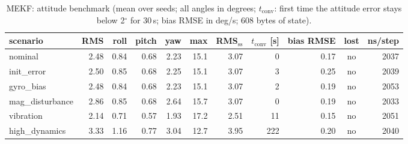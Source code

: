 \begin{table}[H]\centering\footnotesize\setlength{\tabcolsep}{3.5pt}\caption{MEKF: attitude benchmark (mean over seeds; all angles in degrees; $t_\mathrm{conv}$: first time the attitude error stays below 2$^\circ$ for 30\,s; bias RMSE in deg/s; 608 bytes of state).}\label{tab:imu_MEKF}
\begin{tabular}{lrrrrrrrrcr}\toprule scenario & RMS & roll & pitch & yaw & max & RMS$_\mathrm{ss}$ & $t_\mathrm{conv}$ [s] & bias RMSE & lost & ns/step \\ \midrule
nominal & 2.48 & 0.84 & 0.68 & 2.23 & 15.1 & 3.07 & 0 & 0.17 & no & 2037 \\
init\_error & 2.50 & 0.85 & 0.68 & 2.25 & 15.1 & 3.07 & 3 & 0.25 & no & 2039 \\
gyro\_bias & 2.48 & 0.84 & 0.68 & 2.23 & 15.1 & 3.07 & 2 & 0.19 & no & 2053 \\
mag\_disturbance & 2.86 & 0.85 & 0.68 & 2.64 & 15.7 & 3.07 & 0 & 0.19 & no & 2033 \\
vibration & 2.14 & 0.71 & 0.57 & 1.93 & 17.2 & 2.51 & 11 & 0.15 & no & 2051 \\
high\_dynamics & 3.33 & 1.16 & 0.77 & 3.04 & 12.7 & 3.95 & 222 & 0.20 & no & 2040 \\
\bottomrule\end{tabular}\end{table}
